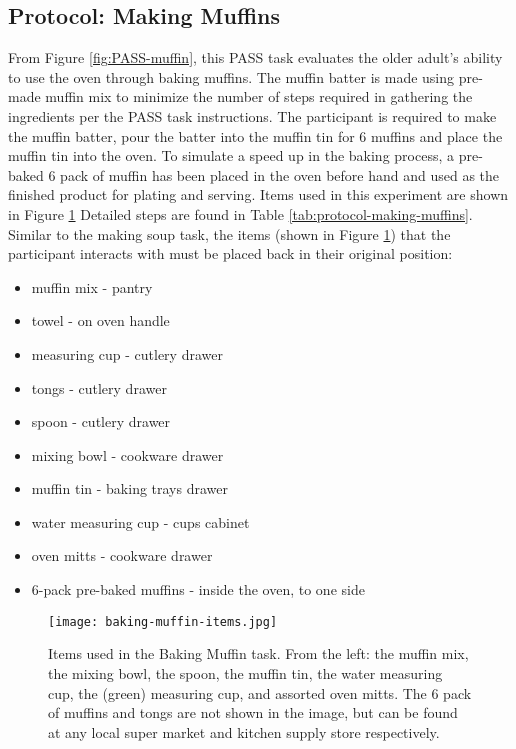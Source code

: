 \subsection{Protocol: Making Muffins}
From Figure \ref{fig:PASS-muffin}, this PASS task evaluates the older adult's ability to use the oven through baking muffins. The muffin batter is made using pre-made muffin mix to minimize the number of steps required in gathering the ingredients per the PASS task instructions. The participant is required to make the muffin batter, pour the batter into the muffin tin for 6 muffins and place the muffin tin into the oven. To simulate a speed up in the baking process, a pre-baked 6 pack of muffin has been placed in the oven before hand and used as the finished product for plating and serving. Items used in this experiment are shown in Figure \ref{fig:PASS-muffin-items} Detailed steps are found in Table \ref{tab:protocol-making-muffins}. Similar to the making soup task, the items (shown in Figure \ref{fig:PASS-muffin-items}) that the participant interacts with must be placed back in their original position:

\begin{itemize}
    \item muffin mix - pantry
    \item towel - on oven handle
    \item measuring cup - cutlery drawer
    \item tongs - cutlery drawer
    \item spoon - cutlery drawer
    \item mixing bowl - cookware drawer
    \item muffin tin - baking trays drawer
    \item water measuring cup - cups cabinet
    \item oven mitts - cookware drawer
    \item 6-pack pre-baked muffins - inside the oven, to one side
\end{itemize}

\begin{figure}[ht]
    \centering
    \texttt{[image: baking-muffin-items.jpg]}
    \caption{Items used in the Baking Muffin task. From the left: the muffin mix, the mixing bowl, the spoon, the muffin tin, the water measuring cup, the (green) measuring cup, and assorted oven mitts. The 6 pack of muffins and tongs are not shown in the image, but can be found at any local super market and kitchen supply store respectively.}
    \label{fig:PASS-muffin-items}
\end{figure}

